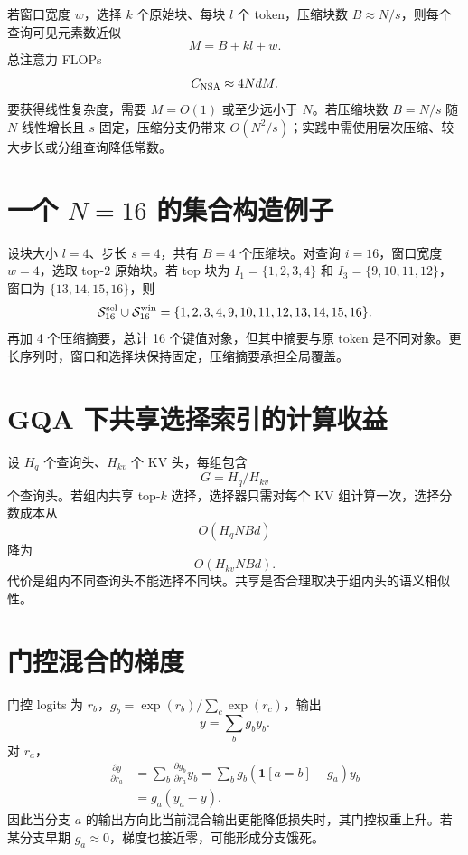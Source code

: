 \documentclass[UTF8,12pt,a4paper,fontset=none]{ctexart}
\numberwithin{equation}{section}
\begin{document}
若窗口宽度 $w$，选择 $k$ 个原始块、每块 $l$ 个 token，压缩块数 $B\approx N/s$，则每个查询可见元素数近似
\begin{equation}
 M=B+kl+w.
\end{equation}
总注意力 FLOPs
\begin{equation}
 C_{\rm NSA}\approx4NdM.
\end{equation}
要获得线性复杂度，需要 $M=O(1)$ 或至少远小于 $N$。若压缩块数 $B=N/s$ 随 $N$ 线性增长且 $s$ 固定，压缩分支仍带来 $O(N^2/s)$；实践中需使用层次压缩、较大步长或分组查询降低常数。

\section{一个 $N=16$ 的集合构造例子}
设块大小 $l=4$、步长 $s=4$，共有 $B=4$ 个压缩块。对查询 $i=16$，窗口宽度 $w=4$，选取 top-$2$ 原始块。若 top 块为 $I_1=\{1,2,3,4\}$ 和 $I_3=\{9,10,11,12\}$，窗口为 $\{13,14,15,16\}$，则
\begin{equation}
 \mathcal S_{16}^{\rm sel}\cup\mathcal S_{16}^{\rm win}
 =\{1,2,3,4,9,10,11,12,13,14,15,16\}.
\end{equation}
再加 4 个压缩摘要，总计 16 个键值对象，但其中摘要与原 token 是不同对象。更长序列时，窗口和选择块保持固定，压缩摘要承担全局覆盖。

\section{GQA 下共享选择索引的计算收益}
设 $H_q$ 个查询头、$H_{kv}$ 个 KV 头，每组包含
\begin{equation}
 G=H_q/H_{kv}
\end{equation}
个查询头。若组内共享 top-$k$ 选择，选择器只需对每个 KV 组计算一次，选择分数成本从
\begin{equation}
 O(H_qNBd)
\end{equation}
降为
\begin{equation}
 O(H_{kv}NBd).
\end{equation}
代价是组内不同查询头不能选择不同块。共享是否合理取决于组内头的语义相似性。

\section{门控混合的梯度}
门控 logits 为 $r_b$，$g_b=\exp(r_b)/\sum_c\exp(r_c)$，输出
\begin{equation}
 y=\sum_bg_by_b.
\end{equation}
对 $r_a$，
\begin{align}
 \frac{\partial y}{\partial r_a}
 &=\sum_b\frac{\partial g_b}{\partial r_a}y_b
 =\sum_bg_b(\mathbf 1[a=b]-g_a)y_b\\
 &=g_a(y_a-y).
\end{align}
因此当分支 $a$ 的输出方向比当前混合输出更能降低损失时，其门控权重上升。若某分支早期 $g_a\approx0$，梯度也接近零，可能形成分支饿死。
\end{document}
